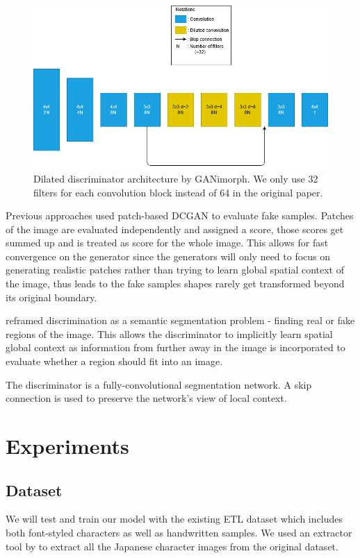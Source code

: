 \documentclass[12pt]{report}
\begin{document}
\begin{figure}[h]
	\centering
	\includegraphics[scale=0.6]{discri-architecture}
	\caption{Dilated discriminator architecture by GANimorph\cite{ganimorph}. We only use 32 filters for each convolution block instead of 64 in the original paper.}
	\label{fig:discri-architecture}
\end{figure}

Previous approaches used patch-based DCGAN \cite{dc-gan} to evaluate fake samples. Patches of the image are evaluated independently and assigned a score, those scores get summed up and is treated as score for the whole image. This allows for fast convergence on the generator since the generators will only need to focus on generating realistic patches rather than trying to learn global spatial context of the image, thus leads to the fake samples shapes rarely get transformed beyond its original boundary.

\cite{ganimorph} reframed discrimination as a semantic segmentation problem - finding real or fake regions of the image. This allows the discriminator to implicitly learn spatial global context as information from further away in the image is incorporated to evaluate whether a region should fit into an image.

The discriminator is a fully-convolutional segmentation network. A skip connection is used to preserve the network's view of local context.

\chapter{Experiments}
\label{chap:experiments}
\section{Dataset}
We will test and train our model with the existing ETL dataset\cite{etl} which includes both font-styled characters as well as handwritten samples.  We used an extractor tool by \cite{etl-extractor} to extract all the Japanese character images from the original dataset.
\end{document}
